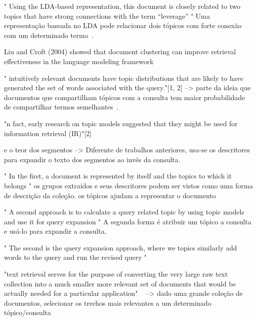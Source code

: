 " Using the LDA-based representation, this document is closely related to two topics that have strong connections with the term “leverage” "
Uma representação baseada no LDA pode relacionar dois tópicos com forte conexão com um determinado termo~\cite{Wei2006}.




Liu and Croft (2004) showed that document clustering can improve retrieval effectiveness in the language modeling framework


" intuitively relevant documents have topic distributions that are likely to have generated the set of words associated with the query."[1, 2]
--> { parte da ideia que documentos que compartilham tópicos com  a consulta tem maior probabilidade de compartilhar termos semelhantes~\cite{Xing2009}. } 

"n fact, early research on topic models suggested that they might be used for information retrieval (IR)"[2]





e o teor dos segmentos
--> { Diferente de trabalhos anteriores, usa-se os descritores para expandir o texto dos segmentos ao invés da consulta. }

" In the first, a document is represented by itself and the topics to which it belongs "
os grupos extraídos e seus descritores podem ser vistos como uma forma de descrição da coleção.
os tópicos ajudam a representar o documento

" A second approach is to calculate a query related topic by using topic models and use it for query expansion "
A segunda forma é atribuir um tópico a consulta e usá-lo para expandir a consulta.
~\cite{Xing2009}

 " The second is the query expansion approach, where we topics similarly add words to the query and run the revised query "



"text retrieval serves for the purpose of converting the very large raw text collection into a much smaller more relevant set of documents that would be actually needed for a particular application"
~\cite{Zhai2017}
--> { dado uma grande coleção de documentos, selecionar os trechos mais relevantes a um determinado tópico/consulta }













